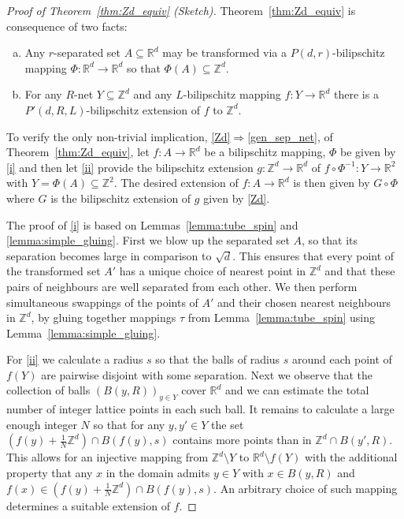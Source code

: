 \documentclass[a4paper, bibliography=totoc]{scrartcl}
\numberwithin{claimcounter}{define}
\newcommand{\R}{\mathbb{R}}
\newcommand{\Z}{\mathbb{Z}}
\newcommand{\br}[1]{\left(#1\right)}
\begin{document}
\begin{proof}[Proof of Theorem~\ref{thm:Zd_equiv} (Sketch)]
	Theorem~\ref{thm:Zd_equiv} is consequence of two facts:
	\begin{enumerate}[(a)]
		\item\label{i} Any $r$-separated set $A\subseteq \R^{d}$ may be transformed via a $P(d,r)$-bilipschitz mapping $\Phi\colon\R^{d}\to\R^{d}$ so that $\Phi(A)\subseteq \Z^{d}$.
		\item\label{ii} For any $R$-net $Y\subseteq \Z^{d}$ and any $L$-bilipschitz mapping $f\colon Y\to \R^{d}$ there is a $P'(d,R,L)$-bilipschitz extension of $f$ to $\Z^{d}$.
	\end{enumerate}
	To verify the only non-trivial implication, \eqref{Zd}$\Rightarrow$\eqref{gen_sep_net}, of Theorem~\ref{thm:Zd_equiv}, let $f\colon A\to \R^{d}$ be a bilipschitz mapping, $\Phi$ be given by \eqref{i} and then let \eqref{ii} provide the bilipschitz extension $g\colon \Z^{d}\to \R^{d}$ of $f\circ \Phi^{-1}\colon Y\to \R^{2}$ with $Y=\Phi(A)\subseteq \Z^{2}$. The desired extension of $f\colon A\to \R^{d}$ is then given by $G\circ \Phi$ where $G$ is the bilipschitz extension of $g$ given by \eqref{Zd}.
	
	The proof of \eqref{i} is based on Lemmas~\ref{lemma:tube_spin} and \ref{lemma:simple_gluing}. First we blow up the separated set $A$, so that its separation becomes large in comparison to $\sqrt{d}$. This ensures that every point of the transformed set $A'$ has a unique choice of nearest point in $\Z^{d}$ and that these pairs of neighbours are well separated from each other. We then perform simultaneous swappings of the points of $A'$ and their chosen nearest neighbours in $\Z^{d}$, by gluing together mappings $\tau$ from Lemma~\ref{lemma:tube_spin} using Lemma~\ref{lemma:simple_gluing}.
	
	For \eqref{ii} we calculate a radius $s$ so that the balls of radius $s$ around each point of $f(Y)$ are pairwise disjoint with some separation. Next we observe that the collection of balls $(B(y,R))_{y\in Y}$ cover $\R^{d}$ and we can estimate the total number of integer lattice points in each such ball. It remains to calculate a large enough integer $N$ so that for any $y,y'\in Y$ the set $\br{f(y)+\frac{1}{N}\Z^{d}}\cap B(f(y),s)$ contains more points than in $\Z^{d}\cap B(y',R)$. This allows for an injective mapping from $\Z^{d}\setminus Y$ to $\R^{d}\setminus f(Y)$ with the additional property that any $x$ in the domain admits $y\in Y$ with $x\in B(y,R)$ and $f(x)\in \br{f(y)+\frac{1}{N}\Z^{d}}\cap B(f(y),s)$. An arbitrary choice of such mapping determines a suitable extension of $f$.
\end{proof}
\end{document}
